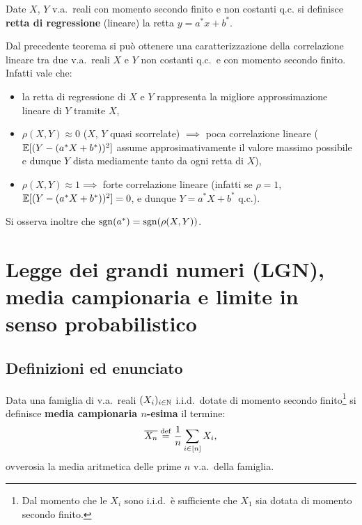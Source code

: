 \begin{multicols*}{2}
\begin{definition}
    Date $X$, $Y$ v.a.~reali con momento secondo finito e non costanti q.c.
    si definisce \textbf{retta di regressione} (lineare) la retta $y = a^*x + b^*$.
\end{definition}

\begin{remark}
    Dal precedente teorema si può ottenere una caratterizzazione della
    correlazione lineare tra due v.a.~reali $X$ e $Y$ non costanti q.c.~e con
    momento secondo finito. Infatti vale che:
    \begin{itemize}
        \item la retta di regressione di $X$ e $Y$ rappresenta la migliore approssimazione
        lineare di $Y$ tramite $X$,
        
        \item $\rho(X, Y) \approx 0$ ($X$, $Y$ quasi scorrelate) $\implies$ poca correlazione lineare ($\mathbb{E}[(Y - (a^* X + b^*))^2]$ assume approsimativamente il valore massimo possibile e dunque $Y$
        dista mediamente tanto da ogni retta di $X$),
        \item $\rho(X, Y) \approx 1 \implies$ forte correlazione lineare (infatti se
        $\rho = 1$, $\mathbb{E}[(Y - (a^* X + b^*))^2] = 0$, e dunque $Y = a^* X + b^*$ q.c.).
    \end{itemize}
    Si osserva inoltre che $\operatorname{sgn}(a^*) = \operatorname{sgn}(\rho(X, Y))$.
\end{remark}

\section{Legge dei grandi numeri (LGN), media campionaria e limite in senso probabilistico}

\subsection{Definizioni ed enunciato}

\label{sec:lgn}

\begin{definition}
    Data una famiglia di v.a.~reali $(X_i)_{i \in \mathbb{N}}$ i.i.d.~dotate di momento secondo
    finito\footnote{
        Dal momento che le $X_i$ sono i.i.d.~è sufficiente che $X_1$ sia dotata di
        momento secondo finito.
    } si definisce \textbf{media campionaria $n$-esima} il termine:
    \[
        \overline{X_n} \overset{\mathrm{def}}{=} \frac{1}{n} \sum_{i \in [n]} X_i, 
    \]
    ovverosia la media aritmetica delle prime $n$ v.a.~della famiglia.
\end{definition}


\end{multicols*}
